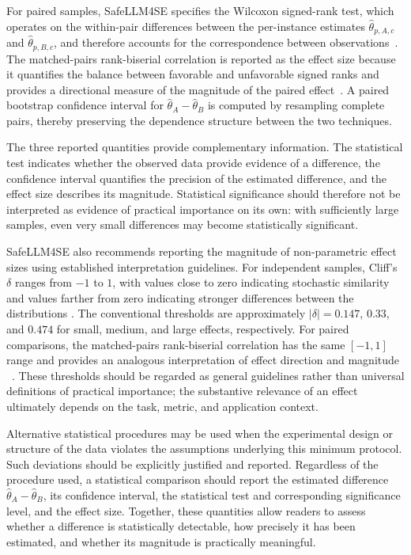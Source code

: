 \documentclass{IEEEcsmag}
\begin{document}
For paired samples, SafeLLM4SE specifies the Wilcoxon signed-rank test, which operates on the within-pair differences between the per-instance estimates $\hat{\theta}_{p,A,c}$ and $\hat{\theta}_{p,B,c}$, and therefore accounts for the correspondence between observations~\cite{Efron1993}. The matched-pairs rank-biserial correlation is reported as the effect size because it quantifies the balance between favorable and unfavorable signed ranks and provides a directional measure of the magnitude of the paired effect~\cite{Kerby2014}. A
paired bootstrap confidence interval for $\hat{\theta}_A-\hat{\theta}_B$ is computed by resampling complete pairs, thereby preserving the dependence structure between the two techniques.

The three reported quantities provide complementary information. The statistical test indicates whether the observed data provide evidence of a
difference, the confidence interval quantifies the precision of the estimated difference, and the effect size describes its magnitude. Statistical
significance should therefore not be interpreted as evidence of practical importance on its own: with sufficiently large samples, even very small
differences may become statistically significant.

SafeLLM4SE also recommends reporting the magnitude of non-parametric effect sizes using established interpretation guidelines. For independent samples, Cliff's $\delta$ ranges from $-1$ to $1$, with values close to zero indicating stochastic similarity and values farther from zero indicating stronger differences between the distributions \cite{Cliff1993}. The conventional thresholds are approximately $|\delta|=0.147$, $0.33$, and $0.474$ for small, medium, and large effects, respectively. For paired comparisons, the matched-pairs rank-biserial correlation has the same $[-1,1]$ range and provides an analogous interpretation of effect direction and magnitude ~\cite{Kerby2014}. These thresholds should be regarded as general guidelines rather than universal definitions of practical importance; the substantive relevance of an effect ultimately depends on the task, metric, and application context.

Alternative statistical procedures may be used when the experimental design or structure of the data violates the assumptions underlying this minimum protocol. Such deviations should be explicitly justified and reported. Regardless of the procedure used, a statistical comparison should report the estimated difference $\hat{\theta}_A-\hat{\theta}_B$, its confidence interval, the statistical test and corresponding significance level, and the effect size. Together, these quantities allow readers to assess whether a difference is statistically detectable, how precisely it has been estimated, and whether its magnitude is practically meaningful.
\end{document}
